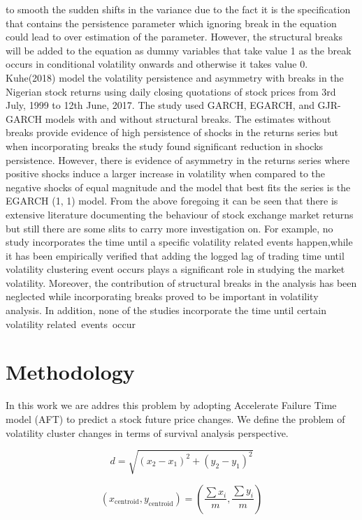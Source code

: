 \documentclass[twoside,a4paper,12pt]{article}
\begin{document}
to smooth the sudden shifts in the variance due to the fact it is the specification that contains the persistence parameter which ignoring break in the equation could lead to over estimation of the parameter. However, the structural breaks will be added to the equation as dummy variables that take value 1 as the break occurs in conditional volatility onwards and otherwise it takes value 0. 
Kuhe(2018) model the volatility persistence and asymmetry with breaks in the Nigerian stock returns using daily closing quotations of stock prices from 3rd July, 1999 to 12th June, 2017. The study used GARCH, EGARCH, and GJR-GARCH models with  and  without  structural  breaks. The estimates without breaks provide evidence of high persistence of shocks in the returns series but  when  incorporating  breaks  the  study  found  significant  reduction  in  shocks  persistence. However, there is  evidence of  asymmetry in  the returns series where positive shocks induce a larger increase in volatility when compared to the negative shocks of equal magnitude and the model that best fits the series is the EGARCH (1, 1) model.
  From  the  above  foregoing  it  can  be  seen  that  there  is  extensive  literature  documenting  the behaviour  of  stock  exchange  market  returns  but  still  there  are  some  slits  to  carry  more investigation on. For example,  no study incorporates  the time until a specific volatility related events happen,while it has been empirically verified that adding the logged lag of trading time until volatility clustering event occurs plays a significant role in studying the market volatility. Moreover, the contribution of structural breaks in the analysis has been neglected while incorporating breaks proved to be important in volatility analysis. In addition, none of the studies incorporate the time until certain volatility related events occur
\section*{Methodology} In this work we are addres this problem by adopting Accelerate Failure Time model (AFT) to predict a stock future price changes. We define the problem of volatility cluster changes in terms of survival analysis perspective.  

\begin{equation}
d = \sqrt{(x_2 - x_1)^2 + (y_2 - y_1)^2}
\end{equation}


\begin{equation}
(x_{\text{centroid}}, y_{\text{centroid}}) = \left(\frac{\sum{x_i}}{m}, \frac{\sum{y_i}}{m}\right)
\end{equation}
\end{document}
